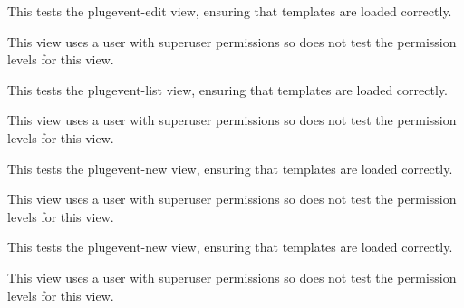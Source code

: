 \documentclass[letterpaper,10pt,english]{sphinxmanual}
\begin{document}
\begin{fulllineitems}
\begin{fulllineitems}
\end{fulllineitems}


\begin{fulllineitems}
\label{api:timed_mating.tests.Timed_MatingViewTests.test_plugevent_edit}
This tests the plugevent-edit view, ensuring that templates are loaded correctly.


This view uses a user with superuser permissions so does not test the permission levels for this view.


\end{fulllineitems}


\begin{fulllineitems}
\label{api:timed_mating.tests.Timed_MatingViewTests.test_plugevent_list}
This tests the plugevent-list view, ensuring that templates are loaded correctly.


This view uses a user with superuser permissions so does not test the permission levels for this view.


\end{fulllineitems}


\begin{fulllineitems}
\label{api:timed_mating.tests.Timed_MatingViewTests.test_plugevent_new}
This tests the plugevent-new view, ensuring that templates are loaded correctly.


This view uses a user with superuser permissions so does not test the permission levels for this view.


\end{fulllineitems}


\begin{fulllineitems}
\label{api:timed_mating.tests.Timed_MatingViewTests.test_plugeventbreeding_new}
This tests the plugevent-new view, ensuring that templates are loaded correctly.


This view uses a user with superuser permissions so does not test the permission levels for this view.


\end{fulllineitems}


\end{fulllineitems}
\end{document}
